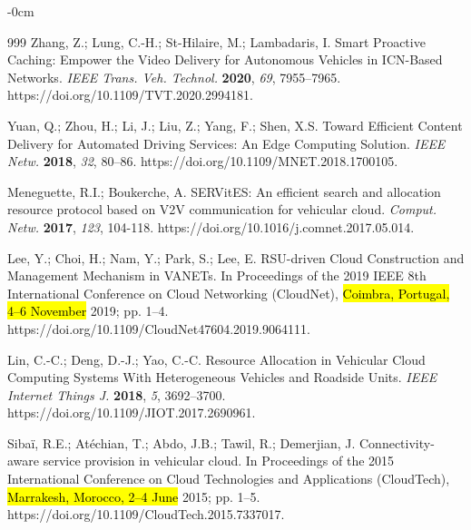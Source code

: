 \documentclass[electronics,aricle,accept,pdftex,moreauthors]{Definitions/mdpi}
\begin{document}
\begin{adjustwidth}{-\extralength}{0cm}
 \begin{thebibliography}{999}
Zhang, Z.; Lung, C.-H.; St-Hilaire, M.; Lambadaris, I.  Smart Proactive Caching: Empower the Video Delivery for Autonomous Vehicles in ICN-Based Networks. \textit{IEEE Trans. Veh. Technol.} \textbf{2020}, \emph{69},  7955--7965. https://doi.org/10.1109/TVT.2020.2994181.

Yuan, Q.; Zhou, H.; Li, J.; Liu, Z.; Yang, F.; Shen, X.S.  Toward Efficient Content Delivery for Automated Driving Services: An Edge Computing Solution. \textit{IEEE Netw.} \textbf{2018}, \emph{32}, 80--86. https://doi.org/10.1109/MNET.2018.1700105.


Meneguette, R.I.; Boukerche, A. SERVitES: An efficient search and allocation resource protocol based on V2V communication for vehicular cloud. \textit{Comput. Netw.} \textbf{2017},  \emph{123}, 104-118. https://doi.org/10.1016/j.comnet.2017.05.014.


Lee, Y.; Choi, H.; Nam, Y.; Park, S.; Lee, E. RSU-driven Cloud Construction and Management Mechanism in VANETs. In Proceedings of the {2019 IEEE 8th International Conference on Cloud Networking (CloudNet)}, \hl{Coimbra, Portugal, 4--6 November} 2019; pp. 1--4. https://doi.org/10.1109/CloudNet47604.2019.9064111.

Lin, C.-C.; Deng, D.-J.; Yao, C.-C. Resource Allocation in Vehicular Cloud Computing Systems With Heterogeneous Vehicles and Roadside Units. \textit{IEEE Internet Things J.} \textbf{2018}, \emph{5}, 3692--3700. https://doi.org/10.1109/JIOT.2017.2690961.

Sibaï, R.E.; Atéchian, T.; Abdo, J.B.; Tawil, R.; Demerjian, J.  Connectivity-aware service provision in vehicular cloud. In Proceedings of the {2015 International Conference on Cloud Technologies and Applications (CloudTech)}, \hl{Marrakesh, Morocco, 2--4 June } %
  2015; pp. 1--5. https://doi.org/10.1109/CloudTech.2015.7337017.


\end{thebibliography}
\end{adjustwidth}
\end{document}
